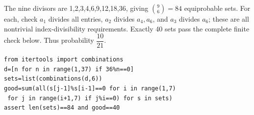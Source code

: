 The nine divisors are 1,2,3,4,6,9,12,18,36, giving $\binom96=84$ equiprobable sets. For each, check $a_1$ divides all entries, $a_2$ divides $a_4,a_6$, and $a_3$ divides $a_6$; these are all nontrivial index-divisibility requirements. Exactly 40 sets pass the complete finite check below. Thus probability $\boxed{\dfrac{10}{21}}$.
\begin{verbatim}
from itertools import combinations
d=[n for n in range(1,37) if 36%n==0]
sets=list(combinations(d,6))
good=sum(all(s[j-1]%s[i-1]==0 for i in range(1,7)
 for j in range(i+1,7) if j%i==0) for s in sets)
assert len(sets)==84 and good==40
\end{verbatim}
